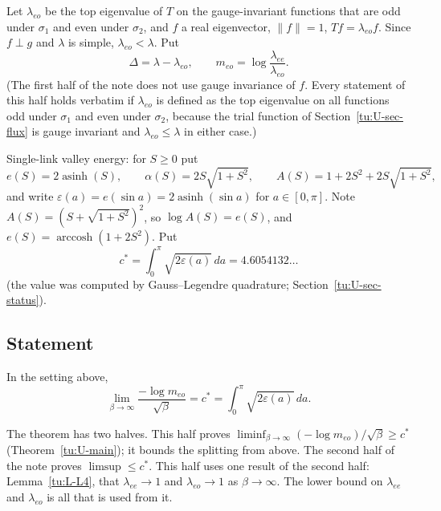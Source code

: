 Let $\lambda_{eo}$ be the top eigenvalue of $T$ on the gauge-invariant functions that are odd under
$\sigma_1$ and even under $\sigma_2$, and $f$ a real eigenvector, $\|f\|=1$, $Tf=\lambda_{eo}f$. Since
$f\perp g$ and $\lambda$ is simple, $\lambda_{eo}<\lambda$. Put
\[
\Delta=\lambda-\lambda_{eo},\qquad m_{eo}=\log\frac{\lambda_{ee}}{\lambda_{eo}}.
\]
(The first half of the note does not use gauge invariance of $f$. Every statement of this half
holds verbatim if $\lambda_{eo}$ is defined as the top eigenvalue on all functions odd under
$\sigma_1$ and even under $\sigma_2$, because the trial function of Section~\ref{tu:U-sec-flux}
is gauge invariant and $\lambda_{eo}\le\lambda$ in either case.)

Single-link valley energy: for $S\ge0$ put
\[
e(S)=2\operatorname{asinh}(S),\qquad \alpha(S)=2S\sqrt{1+S^2},\qquad
A(S)=1+2S^2+2S\sqrt{1+S^2},
\]
and write $\varepsilon(a)=e(\sin a)=2\operatorname{asinh}(\sin a)$ for $a\in[0,\pi]$. Note
$A(S)=(S+\sqrt{1+S^2})^2$, so $\log A(S)=e(S)$, and $e(S)=\operatorname{arccosh}(1+2S^2)$. Put
\[
c^*=\int_0^\pi\sqrt{2\varepsilon(a)}\,da=4.6054132\ldots
\]
(the value was computed by Gauss--Legendre quadrature; Section~\ref{tu:U-sec-status}).

\subsection{Statement}

\begin{theorem}\label{tu:U-thm}
In the setting above,
\[
\lim_{\beta\to\infty}\frac{-\log m_{eo}}{\sqrt\beta}=c^*=\int_0^\pi\sqrt{2\varepsilon(a)}\,da .
\]
\end{theorem}

The theorem has two halves. This half proves
$\liminf_{\beta\to\infty}(-\log m_{eo})/\sqrt\beta\ge c^*$ (Theorem~\ref{tu:U-main}); it bounds the
splitting from above. The second half of the note proves $\limsup\le c^*$. This half uses one result of
the second half: Lemma~\ref{tu:L-L4}, that $\lambda_{ee}\to1$ and $\lambda_{eo}\to1$ as
$\beta\to\infty$. The lower bound on $\lambda_{ee}$ and $\lambda_{eo}$ is all that is used from it.

